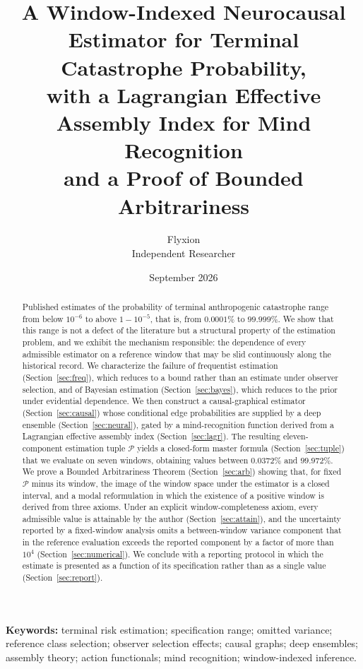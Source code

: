 \documentclass[11pt]{article}
\title{\textbf{A Window-Indexed Neurocausal Estimator for Terminal Catastrophe Probability,\\
with a Lagrangian Effective Assembly Index for Mind Recognition\\
and a Proof of Bounded Arbitrariness}}
\author{Flyxion\\[2pt]\small Independent Researcher}
\date{September 2026}
\theoremstyle{remark}
\begin{document}
\maketitle

\begin{abstract}
\noindent
Published estimates of the probability of terminal anthropogenic catastrophe range from below $10^{-6}$ to above $1-10^{-5}$, that is, from $0.0001\%$ to $99.999\%$. We show that this range is not a defect of the literature but a structural property of the estimation problem, and we exhibit the mechanism responsible: the dependence of every admissible estimator on a reference window that may be slid continuously along the historical record. We characterize the failure of frequentist estimation (Section~\ref{sec:freq}), which reduces to a bound rather than an estimate under observer selection, and of Bayesian estimation (Section~\ref{sec:bayes}), which reduces to the prior under evidential dependence. We then construct a causal-graphical estimator (Section~\ref{sec:causal}) whose conditional edge probabilities are supplied by a deep ensemble (Section~\ref{sec:neural}), gated by a mind-recognition function derived from a Lagrangian effective assembly index (Section~\ref{sec:lagr}). The resulting eleven-component estimation tuple $\mathcal{P}$ yields a closed-form master formula (Section~\ref{sec:tuple}) that we evaluate on seven windows, obtaining values between $0.0372\%$ and $99.972\%$. We prove a Bounded Arbitrariness Theorem (Section~\ref{sec:arb}) showing that, for fixed $\mathcal{P}$ minus its window, the image of the window space under the estimator is a closed interval, and a modal reformulation in which the existence of a positive window is derived from three axioms. Under an explicit window-completeness axiom, every admissible value is attainable by the author (Section~\ref{sec:attain}), and the uncertainty reported by a fixed-window analysis omits a between-window variance component that in the reference evaluation exceeds the reported component by a factor of more than $10^{4}$ (Section~\ref{sec:numerical}). We conclude with a reporting protocol in which the estimate is presented as a function of its specification rather than as a single value (Section~\ref{sec:report}).
\end{abstract}

\medskip
\noindent\textbf{Keywords:} terminal risk estimation; specification range; omitted variance; reference class selection; observer selection effects; causal graphs; deep ensembles; assembly theory; action functionals; mind recognition; window-indexed inference.
\end{document}

